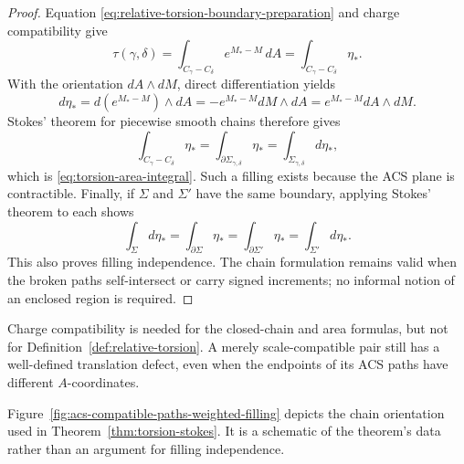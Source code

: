 \begin{proof}
Equation \eqref{eq:relative-torsion-boundary-preparation} and charge
compatibility give
\[
    \tau(\gamma,\delta)
       =\int_{C_\gamma-C_\delta}e^{M_*-M}\,dA
       =\int_{C_\gamma-C_\delta}\eta_*.
\]
With the orientation \(dA\wedge dM\), direct differentiation yields
\[
    d\eta_*
      =d(e^{M_*-M})\wedge dA
      =-e^{M_*-M}dM\wedge dA
      =e^{M_*-M}dA\wedge dM.
\]
Stokes' theorem for piecewise smooth chains therefore gives
\[
    \int_{C_\gamma-C_\delta}\eta_*
      =\int_{\partial\Sigma_{\gamma,\delta}}\eta_*
      =\int_{\Sigma_{\gamma,\delta}}d\eta_*,
\]
which is \eqref{eq:torsion-area-integral}.  Such a filling exists because the
ACS plane is contractible.  Finally, if \(\Sigma\) and \(\Sigma'\) have the
same boundary, applying Stokes' theorem to each shows
\[
    \int_\Sigma d\eta_*
       =\int_{\partial\Sigma}\eta_*
       =\int_{\partial\Sigma'}\eta_*
       =\int_{\Sigma'}d\eta_*.
\]
This also proves filling independence.  The chain formulation remains valid
when the broken paths self-intersect or carry signed increments; no informal
notion of an enclosed region is required.
\end{proof}

Charge compatibility is needed for the closed-chain and area formulas, but not
for Definition~\ref{def:relative-torsion}.  A merely scale-compatible pair
still has a well-defined translation defect, even when the endpoints of its ACS
paths have different \(A\)-coordinates.

Figure~\ref{fig:acs-compatible-paths-weighted-filling} depicts the chain
orientation used in Theorem~\ref{thm:torsion-stokes}.  It is a schematic of
the theorem's data rather than an argument for filling independence.

